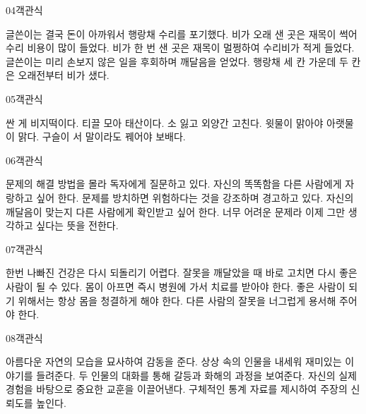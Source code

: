 \documentclass[fs9,seriesFre]{korfarm-base}
\begin{document}
\begin{kfQBlock}{04}{객관식}
\begin{kfChoices}
\kfChoice 글쓴이는 결국 돈이 아까워서 행랑채 수리를 포기했다.
\kfChoice 비가 오래 샌 곳은 재목이 썩어 수리 비용이 많이 들었다.
\kfChoice 비가 한 번 샌 곳은 재목이 멀쩡하여 수리비가 적게 들었다.
\kfChoice 글쓴이는 미리 손보지 않은 일을 후회하며 깨달음을 얻었다.
\kfChoice 행랑채 세 칸 가운데 두 칸은 오래전부터 비가 샜다.
\end{kfChoices}
\end{kfQBlock}
\begin{kfQBlock}{05}{객관식}
\begin{kfChoices}
\kfChoice 싼 게 비지떡이다.
\kfChoice 티끌 모아 태산이다.
\kfChoice 소 잃고 외양간 고친다.
\kfChoice 윗물이 맑아야 아랫물이 맑다.
\kfChoice 구슬이 서 말이라도 꿰어야 보배다.
\end{kfChoices}
\end{kfQBlock}
\begin{kfQBlock}{06}{객관식}
\begin{kfChoices}
\kfChoice 문제의 해결 방법을 몰라 독자에게 질문하고 있다.
\kfChoice 자신의 똑똑함을 다른 사람에게 자랑하고 싶어 한다.
\kfChoice 문제를 방치하면 위험하다는 것을 강조하며 경고하고 있다.
\kfChoice 자신의 깨달음이 맞는지 다른 사람에게 확인받고 싶어 한다.
\kfChoice 너무 어려운 문제라 이제 그만 생각하고 싶다는 뜻을 전한다.
\end{kfChoices}
\end{kfQBlock}
\begin{kfQBlock}{07}{객관식}
\begin{kfChoices}
\kfChoice 한번 나빠진 건강은 다시 되돌리기 어렵다.
\kfChoice 잘못을 깨달았을 때 바로 고치면 다시 좋은 사람이 될 수 있다.
\kfChoice 몸이 아프면 즉시 병원에 가서 치료를 받아야 한다.
\kfChoice 좋은 사람이 되기 위해서는 항상 몸을 청결하게 해야 한다.
\kfChoice 다른 사람의 잘못을 너그럽게 용서해 주어야 한다.
\end{kfChoices}
\end{kfQBlock}
\begin{kfQBlock}{08}{객관식}
\begin{kfChoices}
\kfChoice 아름다운 자연의 모습을 묘사하여 감동을 준다.
\kfChoice 상상 속의 인물을 내세워 재미있는 이야기를 들려준다.
\kfChoice 두 인물의 대화를 통해 갈등과 화해의 과정을 보여준다.
\kfChoice 자신의 실제 경험을 바탕으로 중요한 교훈을 이끌어낸다.
\kfChoice 구체적인 통계 자료를 제시하여 주장의 신뢰도를 높인다.
\end{kfChoices}
\end{kfQBlock}
\end{document}
